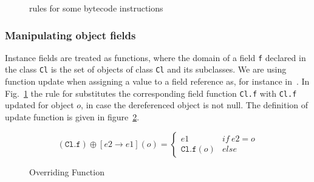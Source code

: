 \begin{figure}[ht]
\caption{rules for some bytecode instructions}
\label{instrWP}
\end{figure}

\subsubsection{Manipulating object fields}
Instance fields are treated as functions, where the domain of a field \texttt{f} 
declared in the class \texttt{Cl} is the set of objects of class \texttt{Cl} and its subclasses.
We are using function update when assigning a value to a field reference as, for instance in~\cite{B00ppp}. 
In Fig.~\ref{instrWP} the rule for  substitutes the corresponding field function \texttt{Cl.f} with \texttt{Cl.f} updated for object $o$, in case the dereferenced object is not null. The definition of update function is given in figure~\ref{override}.

\begin{figure}
$$
 (\texttt{Cl.f})\oplus[e2 \rightarrow e1](o) = \left\{ \begin{array} {ll}
						       e1 & if \ e2 = o \\
					               \texttt{Cl.f}(o)	& else 
	\end{array}\right. 
$$ 
\caption{Overriding Function}
\label{override}
\end{figure}



